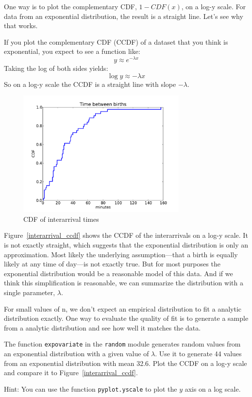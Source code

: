 \documentclass[12pt]{book}
\begin{document}
One way is to plot the complementary CDF, $1 - CDF(x)$, on a
log-y scale.  For data from an exponential distribution, the result
is a straight line.  Let's see why that works.

If you plot the complementary CDF (CCDF) of a dataset that you think is
exponential, you expect to see a function like:
%
\[ y \approx e^{-\lambda x} \]
%
Taking the log of both sides yields:
%
\[ \log y \approx -\lambda x\]
%
So on a log-y scale the CCDF is a straight line
with slope $-\lambda$.

\begin{figure}
\centerline{\includegraphics[height=2.5in]{figs/interarrivals.pdf}}
\caption{CDF of interarrival times}
\label{interarrival_cdf}
\end{figure}

Figure~\ref{interarrival_ccdf} shows the CCDF of the interarrivals on
a log-y scale.  It is not exactly straight, which suggests that the
exponential distribution is only an approximation.  Most likely the
underlying assumption---that a birth is equally likely at any time of
day---is not exactly true.  But for most purposes the exponential
distribution would be a reasonable model of this data.  And if we
think this simplification is reasonable, we can summarize the distribution
with a single parameter, $\lambda$.

\begin{exercise}
For small values of n, we don't expect an empirical distribution
to fit a analytic distribution exactly.  One way to evaluate
the quality of fit is to generate a sample from a analytic
distribution and see how well it matches the data.

The function {\tt expovariate} in the {\tt random} module generates
random values from an exponential distribution with a given value of
$\lambda$.  Use it to generate 44 values from an exponential
distribution with mean 32.6.  Plot the CCDF on a log-y scale and
compare it to Figure~\ref{interarrival_ccdf}.

Hint: You can use the function {\tt pyplot.yscale} to plot the $y$ axis
on a log scale.

\end{exercise}
\end{document}
